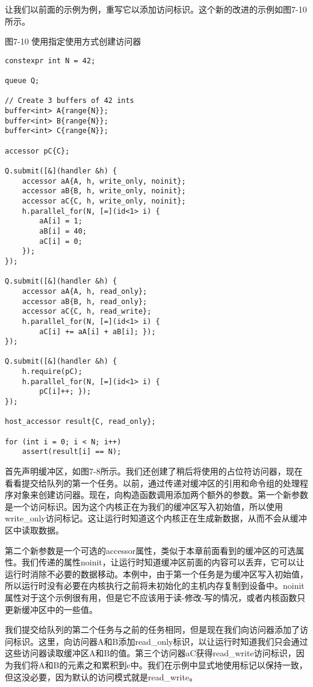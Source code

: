 让我们以前面的示例为例，重写它以添加访问标识。这个新的改进的示例如图7-10所示。\par

\hspace*{\fill} \par %
图7-10 使用指定使用方式创建访问器
\begin{lstlisting}[caption={}]
constexpr int N = 42;

queue Q;

// Create 3 buffers of 42 ints
buffer<int> A{range{N}};
buffer<int> B{range{N}};
buffer<int> C{range{N}};

accessor pC{C};

Q.submit([&](handler &h) {
	accessor aA{A, h, write_only, noinit};
	accessor aB{B, h, write_only, noinit};
	accessor aC{C, h, write_only, noinit};
	h.parallel_for(N, [=](id<1> i) {
		aA[i] = 1;
		aB[i] = 40;
		aC[i] = 0;
	});
});

Q.submit([&](handler &h) {
	accessor aA{A, h, read_only};
	accessor aB{B, h, read_only};
	accessor aC{C, h, read_write};
	h.parallel_for(N, [=](id<1> i) {
		aC[i] += aA[i] + aB[i]; });
});

Q.submit([&](handler &h) {
	h.require(pC);
	h.parallel_for(N, [=](id<1> i) {
		pC[i]++; });
});

host_accessor result{C, read_only};

for (int i = 0; i < N; i++)
	assert(result[i] == N);
\end{lstlisting}

首先声明缓冲区，如图7-8所示。我们还创建了稍后将使用的占位符访问器，现在看看提交给队列的第一个任务。以前，通过传递对缓冲区的引用和命令组的处理程序对象来创建访问器。现在，向构造函数调用添加两个额外的参数。第一个新参数是一个访问标识。因为这个内核正在为我们的缓冲区写入初始值，所以使用write\_only访问标记。这让运行时知道这个内核正在生成新数据，从而不会从缓冲区中读取数据。\par

第二个新参数是一个可选的accessor属性，类似于本章前面看到的缓冲区的可选属性。我们传递的属性noinit，让运行时知道缓冲区前面的内容可以丢弃，它可以让运行时消除不必要的数据移动。本例中，由于第一个任务是为缓冲区写入初始值，所以运行时没有必要在内核执行之前将未初始化的主机内存复制到设备中。noinit属性对于这个示例很有用，但是它不应该用于读-修改-写的情况，或者内核函数只更新缓冲区中的一些值。\par

我们提交给队列的第二个任务与之前的任务相同，但是现在我们向访问器添加了访问标识。这里，向访问器A和B添加read\_only标识，以让运行时知道我们只会通过这些访问器读取缓冲区A和B的值。第三个访问器aC获得read\_write访问标识，因为我们将A和B的元素之和累积到c中。我们在示例中显式地使用标记以保持一致，但这没必要，因为默认的访问模式就是read\_write。\par

